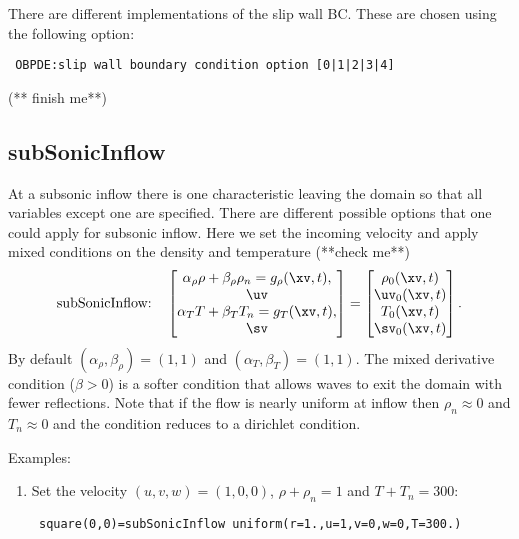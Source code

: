 There are different implementations of the slip wall BC. These are
chosen using the following option:
\begin{flushleft}\tt
  OBPDE:slip wall boundary condition option [0|1|2|3|4]
\end{flushleft}
(** finish me**)

\subsection{subSonicInflow} \label{sec:bc:subSonicInflow}

At a subsonic inflow there is one characteristic leaving the domain so
that all variables except one are specified. There are different possible options
that one could apply for subsonic inflow. 
Here we set the incoming velocity and apply mixed conditions on
the density and temperature (**check me**)
\begin{align}
  \text{subSonicInflow:}\quad
   \begin{bmatrix}
   \alpha_\rho \rho + \beta_\rho \rho_n  = g_{\rho}(\xv,t) , \\
       \uv  \\
   \alpha_T T + \beta_T T_n  = g_T(\xv,t), \\
       \sv  
   \end{bmatrix}
  = 
   \begin{bmatrix}
       \rho_0(\xv,t) \\
       \uv_0(\xv,t)  \\
       T_0(\xv,t) \\
       \sv_0(\xv,t)  
   \end{bmatrix}.
\end{align}
By default $(\alpha_\rho,\beta_\rho)=(1,1)$ and $(\alpha_T,\beta_T)=(1,1)$.
The mixed derivative condition ($\beta>0$) is a softer condition that allows waves to exit
the domain with fewer reflections. Note that if the flow is nearly uniform at inflow then
$\rho_n\approx 0$ and $T_n \approx 0$ 
and the condition reduces to a dirichlet condition. 

Examples:
\begin{enumerate}
  \item Set the velocity $(u,v,w)=(1,0,0)$, $\rho+\rho_n=1$ and $T+T_n=300$:
  \begin{flushleft}\tt
    square(0,0)=subSonicInflow uniform(r=1.,u=1,v=0,w=0,T=300.)
  \end{flushleft}
\end{enumerate}


